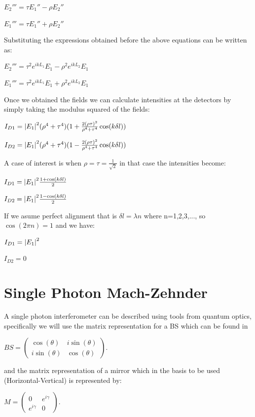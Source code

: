 \documentclass[11pt]{article}
\begin{document}
$E_{2}'''=\tau E_{1}'' -\rho E_{2}''$

$E_{1}'''=\tau E_{1}'' +\rho E_{2}''$

Substituting the expressions obtained before the above equations can be written as:


$E_{2}'''=\tau^2 e^{ikL_{1}} E_{1} -\rho^2 e^{ikL_{2}}E_{1}$

$E_{1}'''=\tau^2 e^{ikL_{1}} E_{1} +\rho^2 e^{ikL_{2}}E_{1}$

Once we obtained the fields we can calculate intensities at the detectors by simply taking the modulus squared of the fields:

$I_{D1}=\abs{E_{1}}^2 (\rho^4 +\tau^4)(1+\frac{2 (\rho \tau)^2}{\rho^4+\tau^4}\cos(k\delta l))$

$I_{D2}=\abs{E_{1}}^2 (\rho^4 +\tau^4)(1-\frac{2 (\rho \tau)^2}{\rho^4+\tau^4}\cos(k\delta l))$

A case of interest is when $\rho=\tau=\frac{1}{\sqrt{2}}$ in that case the intensities become:

$I_{D1}=\abs{E_{1}}^2 \frac{1+\cos(k \delta l)}{2}$

 $I_{D2}=\abs{E_{1}}^2 \frac{1-\cos(k \delta l)}{2}$
 
 If we asume perfect alignment that is $\delta l=\lambda n$ where n=1,2,3,..., so $\cos(2 \pi n )=1$ and we have:
 
 $I_{D1}=\abs{E_{1}}^2$
 
 $I_{D2}=0$

\section{Single Photon Mach-Zehnder}

A single photon interferometer can be described using tools from quantum optics, specifically we will use the matrix representation for a BS which can be found in \cite{leonhardt}

$BS=\begin{pmatrix} \cos(\theta) & i \sin(\theta) \\ i \sin(\theta) & 
\cos(\theta) \end{pmatrix} $.

 and the matrix representation of a mirror which in the basis to be used (Horizontal-Vertical) is represented by:

$M=\begin{pmatrix} 0& e^{i\gamma} \\ e^{i\gamma} & 0 \end{pmatrix}$.
\end{document}
